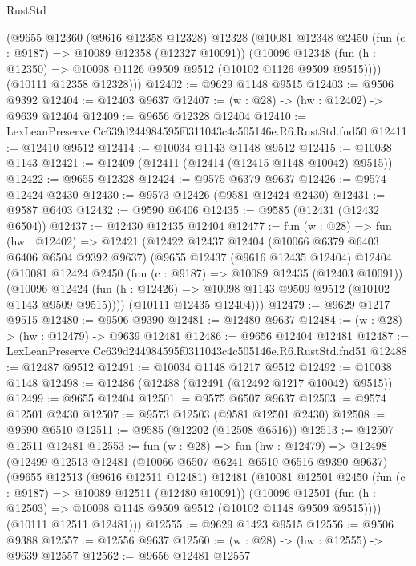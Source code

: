 \begin{lexlean}{RustStd}
\begin{coremodule}
      (@9655
        @12360
        (@9616 @12358 @12328)
        @12328
        (@10081
          @12348
          @2450
          (fun (c : @9187) => @10089 @12358 (@12327 @10091))
          (@10096 @12348 (fun (h : @12350) => @10098 @1126 @9509 @9512 (@10102 @1126 @9509 @9515))))
        (@10111 @12358 @12328)))
@12402 := @9629 @1148 @9515
@12403 := @9506 @9392
@12404 := @12403 @9637
@12407 := (w : @28) -> (hw : @12402) -> @9639 @12404
@12409 := @9656 @12328 @12404
@12410 := LexLeanPreserve.Cc639d244984595f0311043c4c505146e.R6.RustStd.fnd50
@12411 := @12410 @9512
@12414 := @10034 @1143 @1148 @9512
@12415 := @10038 @1143
@12421 := @12409 (@12411 (@12414 (@12415 @1148 @10042) @9515))
@12422 := @9655 @12328
@12424 := @9575 @6379 @9637
@12426 := @9574 @12424 @2430
@12430 := @9573 @12426 (@9581 @12424 @2430)
@12431 := @9587 @6403
@12432 := @9590 @6406
@12435 := @9585 (@12431 (@12432 @6504))
@12437 := @12430 @12435 @12404
@12477 := fun (w : @28) =>
  fun (hw : @12402) =>
  @12421
    (@12422
      @12437
      @12404
      (@10066 @6379 @6403 @6406 @6504 @9392 @9637)
      (@9655
        @12437
        (@9616 @12435 @12404)
        @12404
        (@10081
          @12424
          @2450
          (fun (c : @9187) => @10089 @12435 (@12403 @10091))
          (@10096 @12424 (fun (h : @12426) => @10098 @1143 @9509 @9512 (@10102 @1143 @9509 @9515))))
        (@10111 @12435 @12404)))
@12479 := @9629 @1217 @9515
@12480 := @9506 @9390
@12481 := @12480 @9637
@12484 := (w : @28) -> (hw : @12479) -> @9639 @12481
@12486 := @9656 @12404 @12481
@12487 := LexLeanPreserve.Cc639d244984595f0311043c4c505146e.R6.RustStd.fnd51
@12488 := @12487 @9512
@12491 := @10034 @1148 @1217 @9512
@12492 := @10038 @1148
@12498 := @12486 (@12488 (@12491 (@12492 @1217 @10042) @9515))
@12499 := @9655 @12404
@12501 := @9575 @6507 @9637
@12503 := @9574 @12501 @2430
@12507 := @9573 @12503 (@9581 @12501 @2430)
@12508 := @9590 @6510
@12511 := @9585 (@12202 (@12508 @6516))
@12513 := @12507 @12511 @12481
@12553 := fun (w : @28) =>
  fun (hw : @12479) =>
  @12498
    (@12499
      @12513
      @12481
      (@10066 @6507 @6241 @6510 @6516 @9390 @9637)
      (@9655
        @12513
        (@9616 @12511 @12481)
        @12481
        (@10081
          @12501
          @2450
          (fun (c : @9187) => @10089 @12511 (@12480 @10091))
          (@10096 @12501 (fun (h : @12503) => @10098 @1148 @9509 @9512 (@10102 @1148 @9509 @9515))))
        (@10111 @12511 @12481)))
@12555 := @9629 @1423 @9515
@12556 := @9506 @9388
@12557 := @12556 @9637
@12560 := (w : @28) -> (hw : @12555) -> @9639 @12557
@12562 := @9656 @12481 @12557

\end{coremodule}
\end{lexlean}
